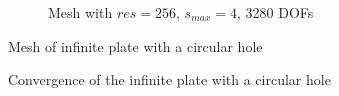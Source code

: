 \begin{figure}[!ht]\ContinuedFloat
    \begin{subfigure}[b]{1\linewidth}
        \centering
        \caption{Mesh with $res=256$, $s_{max}=4$, 3280 DOFs}
    \end{subfigure}
    \caption[Mesh of the infinite plate with a circular hole]{Mesh of infinite plate with a circular hole}
    \label{qdt_fig:ex_chole_mesh_all}
\end{figure}


\begin{figure}[!ht]
    \centering
    \caption[Convergence of the infinite plate with a circular hole]{Convergence of the infinite plate with a circular hole}
    \label{qdt_fig:ex_chole_mesh_conv}
\end{figure}